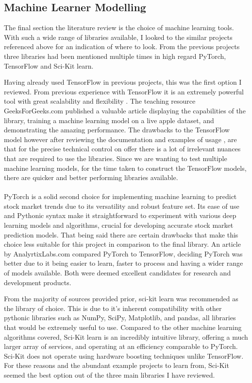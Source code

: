 \documentclass[11pt, a4paper]{article}
\begin{document}
\subsection{Machine Learner Modelling}
The final section the literature review is the choice of machine learning tools. With such a wide range of libraries available, I looked to the similar projects referenced above for an indication of where to look. From the previous projects three libraries had been mentioned multiple times in high regard PyTorch, TensorFlow and Sci-Kit learn.

Having already used TensorFlow in previous projects, this was the first option I reviewed. From previous experience with TensorFlow it is an extremely powerful tool with great scalability and flexibility . The teaching resource GeeksForGeeks.com published a valuable article \cite{TensorFlow} displaying the capabilities of the library, training a machine learning model on a live apple dataset, and demonstrating the amazing performance. The drawbacks to the TensorFlow model however after reviewing the documentation \cite{TensorFlow2} and examples of usage \cite{TensorFlow3}, are that for the precise technical control on offer there is a lot of irrelevant nuances that are required to use the libraries. Since we are wanting to test multiple machine learning models, for the time taken to construct the TensorFlow models, there are quicker and better performing libraries available.\\
\\
PyTorch is a solid second choice for implementing machine learning to predict stock market trends due to its versatility and robust feature set. Its ease of use and Pythonic syntax make it straightforward to experiment with various deep learning models and algorithms, crucial for developing accurate stock market prediction models. That being said there are certain drawbacks that make this choice less suitable for this project in comparison to the final library. An article by AnalyrtixLabs.com \cite{PTvTF} compared PyTorch to TensorFlow, deciding PyTorch was better due to it being easier to learn, faster to process and having a wider range of models available. Both were deemed excellent candidates for research and development products.

From the majority of sources provided prior, sci-kit learn was recommended as the library of choice. This is due to it's inherent compatibility with other pythonic libraries such as NumPy, SciPy, Matplotlib, and pandas, all libraries that would be extremely useful to use. Compared to the other machine learning algorithms covered, Sci-Kit learn is an incredibly intuitive library, offering a much larger array of services, and operating at an efficiency comparable to PyTorch. Sci-Kit does not operate using hardware boosting techniques unlike TensorFlow. For these reasons and the abundant example projects to learn from, Sci-Kit seemed the best option out of the three main libraries I have reviewed.
\end{document}
